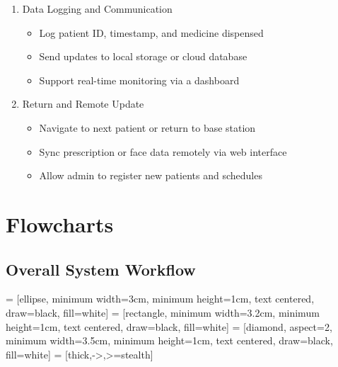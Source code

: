 \begin{enumerate}
    \item Data Logging and Communication
    \begin{itemize}
        \item Log patient ID, timestamp, and medicine dispensed
        \item Send updates to local storage or cloud database
        \item Support real-time monitoring via a dashboard
    \end{itemize}

    \item Return and Remote Update
    \begin{itemize}
        \item Navigate to next patient or return to base station
        \item Sync prescription or face data remotely via web interface
        \item Allow admin to register new patients and schedules
    \end{itemize}
\end{enumerate}

\vspace{1.5\baselineskip}
\newpage
\section{Flowcharts}

\subsection{Overall System Workflow}

 = [ellipse, minimum width=3cm, minimum height=1cm, text centered, draw=black, fill=white]
 = [rectangle, minimum width=3.2cm, minimum height=1cm, text centered, draw=black, fill=white]
 = [diamond, aspect=2, minimum width=3.5cm, minimum height=1cm, text centered, draw=black, fill=white]
 = [thick,->,>=stealth]

